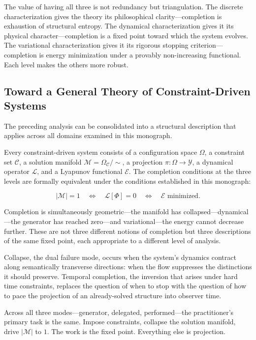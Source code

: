 \documentclass[11pt, twoside]{article}
\theoremstyle{plain}
\theoremstyle{definition}
\theoremstyle{remark}
\newcommand{\OmC}{\Omega_{\mathcal{C}}}
\begin{document}
The value of having all three is not redundancy but triangulation. The discrete characterization gives the theory its philosophical clarity---completion is exhaustion of structural entropy. The dynamical characterization gives it its physical character---completion is a fixed point toward which the system evolves. The variational characterization gives it its rigorous stopping criterion---completion is energy minimization under a provably non-increasing functional. Each level makes the others more robust.

\subsection{Toward a General Theory of Constraint-Driven Systems}

The preceding analysis can be consolidated into a structural description that applies across all domains examined in this monograph.

Every constraint-driven system consists of a configuration space $\Omega$, a constraint set $\mathcal{C}$, a solution manifold $\mathcal{M} = \OmC / {\sim}$, a projection $\pi : \Omega \to \mathcal{Y}$, a dynamical operator $\mathcal{L}$, and a Lyapunov functional $\mathcal{E}$. The completion conditions at the three levels are formally equivalent under the conditions established in this monograph:

\[
|\mathcal{M}| = 1 \quad \Longleftrightarrow \quad \mathcal{L}[\Phi] = 0 \quad \Longleftrightarrow \quad \mathcal{E} \text{ minimized}.
\]

Completion is simultaneously geometric---the manifold has collapsed---dynamical---the generator has reached zero---and variational---the energy cannot decrease further. These are not three different notions of completion but three descriptions of the same fixed point, each appropriate to a different level of analysis.

Collapse, the dual failure mode, occurs when the system's dynamics contract along semantically transverse directions: when the flow suppresses the distinctions it should preserve. Temporal completion, the inversion that arises under hard time constraints, replaces the question of when to stop with the question of how to pace the projection of an already-solved structure into observer time.

Across all three modes---generator, delegated, performed---the practitioner's primary task is the same. Impose constraints, collapse the solution manifold, drive $|\mathcal{M}|$ to $1$. The work is the fixed point. Everything else is projection.
\end{document}

